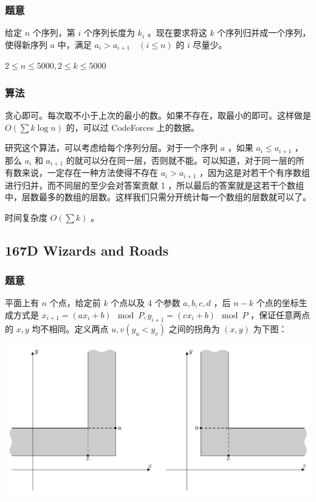 \documentclass[11pt]{article}
\begin{document}
\subsubsection{题意}
\label{sec-12-1-1}

给定 $n$ 个序列，第 $i$ 个序列长度为 $k_i$ 。现在要求将这 $k$ 个序列归并成一个序列，使得新序列 $a$ 中，满足 $a_i > a_{i + 1} \quad (i \leq n)$ 的 $i$ 尽量少。

$2 \leq n \leq 5000, 2 \leq k \leq 5000$
\subsubsection{算法}
\label{sec-12-1-2}

贪心即可。每次取不小于上次的最小的数。如果不存在，取最小的即可。这样做是 $O(\sum k \log n)$ 的，可以过 CodeForces 上的数据。

研究这个算法，可以考虑给每个序列分层。对于一个序列 $a$ ，如果 $a_i \leq a_{i + 1}$ ，那么 $a_i$ 和 $a_{i + 1}$ 的就可以分在同一层，否则就不能。可以知道，对于同一层的所有数来说，一定存在一种方法使得不存在 $a_i > a_{i + 1}$ ，因为这是对若干个有序数组进行归并，而不同层的至少会对答案贡献 1 ，所以最后的答案就是这若干个数组中，层数最多的数组的层数。这样我们只需分开统计每一个数组的层数就可以了。

时间复杂度 $O(\sum k)$ 。
\subsection{167D  Wizards and Roads}
\label{sec-12-2}
\subsubsection{题意}
\label{sec-12-2-1}

平面上有 $n$ 个点，给定前 $k$ 个点以及 4 个参数 $a, b, c, d$ ，后 $n - k$ 个点的坐标生成方式是 $x_{i + 1} = (a x_i + b) \mod{P}, y_{i + 1} = (c x_i + b) \mod{P}$ ，保证任意两点的 $x, y$ 均不相同。定义两点 $u, v (y_u < y_v)$ 之间的拐角为 $(x, y)$ 为下图：

\begin{center}\includegraphics[scale = 1]{pic/167D.png}\end{center}
\end{document}
